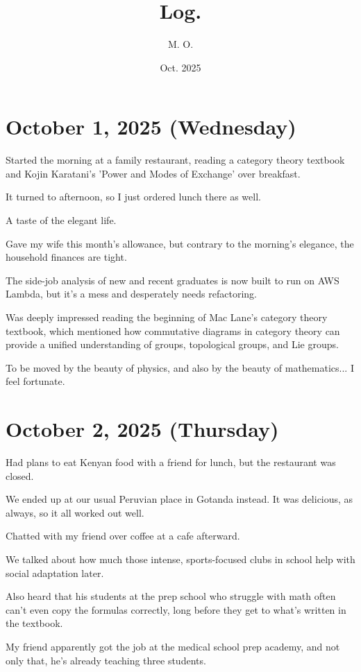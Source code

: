 \documentclass{article}
\title{
Log.
}
\author{
M. O.
}
\date{Oct. 2025}
\begin{document}
\maketitle

\section{October 1, 2025 (Wednesday)}

Started the morning at a family restaurant, reading a category theory textbook and Kojin Karatani's 'Power and Modes of Exchange' over breakfast.

It turned to afternoon, so I just ordered lunch there as well.

A taste of the elegant life.

Gave my wife this month's allowance, but contrary to the morning's elegance, the household finances are tight.

The side-job analysis of new and recent graduates is now built to run on AWS Lambda, but it's a mess and desperately needs refactoring.

Was deeply impressed reading the beginning of Mac Lane's category theory textbook, which mentioned how commutative diagrams in category theory can provide a unified understanding of groups, topological groups, and Lie groups.

To be moved by the beauty of physics, and also by the beauty of mathematics... I feel fortunate.

\section{October 2, 2025 (Thursday)}

Had plans to eat Kenyan food with a friend for lunch, but the restaurant was closed.

We ended up at our usual Peruvian place in Gotanda instead. It was delicious, as always, so it all worked out well.

Chatted with my friend over coffee at a cafe afterward.

We talked about how much those intense, sports-focused clubs in school help with social adaptation later.

Also heard that his students at the prep school who struggle with math often can't even copy the formulas correctly, long before they get to what's written in the textbook.

My friend apparently got the job at the medical school prep academy, and not only that, he's already teaching three students.
\end{document}
